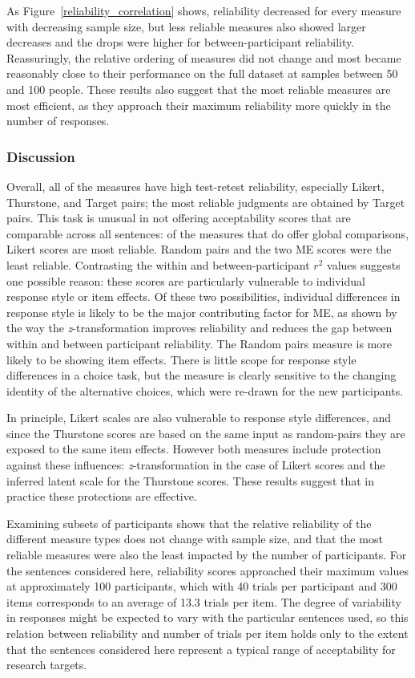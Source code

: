 \documentclass[doc]{apa6}
\newcommand{\targchoice}{{\sc Target pairs}}
\newcommand{\rndchoice}{{\sc Random pairs}}
\newcommand{\ME}{{\sc ME}}%
\newcommand{\thurstone}{{\sc Thurstone}}
\newcommand{\likert}{{\sc Likert}}
\newcommand{\choicetask}{choice task}
\begin{document}
As Figure~\ref{reliability_correlation} shows, reliability decreased for every measure with decreasing sample size, but less reliable measures also showed larger decreases and the drops were higher for between-participant reliability. Reassuringly, the relative ordering of measures did not change and most became reasonably close to their performance on the full dataset at samples between 50 and 100 people. These results also suggest that the most reliable measures are most efficient, as they approach their maximum reliability more quickly in the number of responses.

\subsubsection{Discussion}

Overall, all of the measures have high test-retest reliability, especially \likert, \thurstone, and \targchoice; the most reliable judgments are obtained by \targchoice. This task is unusual in not offering acceptability scores that are comparable across all sentences: of the measures that do offer global comparisons, \likert{} scores are most reliable. \rndchoice{} and the two \ME{} scores were the least reliable. Contrasting the within and between-participant $r^2$ values suggests one possible reason: these scores are particularly vulnerable to individual response style or item effects. Of these two possibilities, individual differences in response style is likely to be the major contributing factor for \ME, as shown by the way the {\it z}-transformation improves reliability and reduces the gap between within and between participant reliability.
The \rndchoice{} measure is more likely to be showing item effects. There is little scope for response style differences in a \choicetask, but the measure is clearly sensitive to the changing identity of the alternative choices, which were re-drawn for the new participants.

In principle, \likert{} scales are also vulnerable to response style differences, and since the \thurstone{} scores are based on the same input as random-pairs they are exposed to the same item effects. However both measures include protection against these influences: {\it z}-transformation in the case of \likert{} scores and the inferred latent scale for the \thurstone{} scores. These results suggest that in practice these protections are effective.

Examining subsets of participants shows that the relative reliability of the different measure types does not change with sample size, and that the most reliable measures were also the least impacted by the number of participants. For the sentences considered here, reliability scores approached their maximum values at approximately 100 participants, which with 40 trials per participant and 300 items corresponds to an average of 13.3 trials per item. The degree of variability in responses might be expected to vary with the particular sentences used, so this relation between reliability and number of trials per item holds only to the extent that the sentences considered here represent a typical range of acceptability for research targets.
\end{document}

